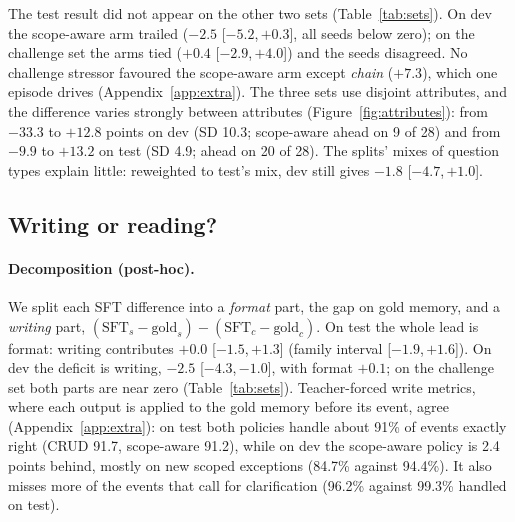 \documentclass[11pt]{article}
\newcommand{\iv}[2]{[$#1$,\,$#2$]}
\begin{document}
The test result did not appear on the other two sets (Table~\ref{tab:sets}). On dev the scope-aware arm trailed ($-2.5$ \iv{-5.2}{+0.3}, all seeds below zero); on the challenge set the arms tied ($+0.4$ \iv{-2.9}{+4.0}) and the seeds disagreed. No challenge stressor favoured the scope-aware arm except \emph{chain} ($+7.3$), which one episode drives (Appendix~\ref{app:extra}). The three sets use disjoint attributes, and the difference varies strongly between attributes (Figure~\ref{fig:attributes}): from $-33.3$ to $+12.8$ points on dev (SD 10.3; scope-aware ahead on 9 of 28) and from $-9.9$ to $+13.2$ on test (SD 4.9; ahead on 20 of 28). The splits' mixes of question types explain little: reweighted to test's mix, dev still gives $-1.8$ \iv{-4.7}{+1.0}.

\subsection{Writing or reading?}\label{sec:readwrite}

\paragraph{Decomposition (post-hoc).} We split each SFT difference into a \emph{format} part, the gap on gold memory, and a \emph{writing} part, $(\text{SFT}_{s}-\text{gold}_{s})-(\text{SFT}_{c}-\text{gold}_{c})$. On test the whole lead is format: writing contributes $+0.0$ \iv{-1.5}{+1.3} (family interval \iv{-1.9}{+1.6}). On dev the deficit is writing, $-2.5$ \iv{-4.3}{-1.0}, with format $+0.1$; on the challenge set both parts are near zero (Table~\ref{tab:sets}). Teacher-forced write metrics, where each output is applied to the gold memory before its event, agree (Appendix~\ref{app:extra}): on test both policies handle about 91\% of events exactly right (CRUD 91.7, scope-aware 91.2), while on dev the scope-aware policy is 2.4 points behind, mostly on new scoped exceptions (84.7\% against 94.4\%). It also misses more of the events that call for clarification (96.2\% against 99.3\% handled on test).
\end{document}
